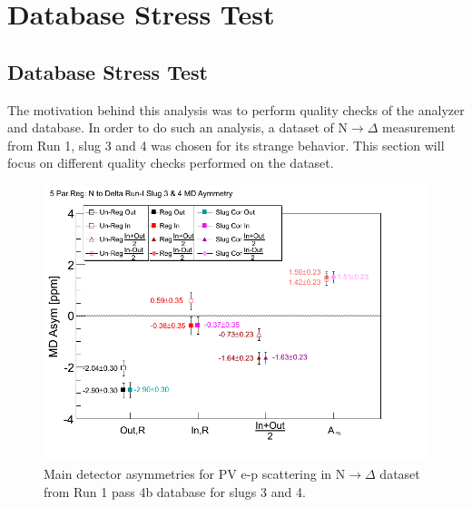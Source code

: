 \chapter{Database Stress Test}
\label{Database Stress Test}

\section{Database Stress Test}
\label{Database Stress Test}

The motivation behind this analysis was to perform quality checks of the analyzer and database. In order to do such an analysis, a dataset of N$\rightarrow\Delta$ measurement from Run 1, slug 3 and 4 was chosen for its strange behavior. This section will focus on different quality checks performed on the dataset. 



\begin{singlespace}
\begin{figure}[!h]
	\begin{center}
	\includegraphics[width=15.0cm]{figures/n2DeltaMDSummaryPlotReg5}
	\end{center}
	\caption
	{Main detector asymmetries for PV e-p scattering in N$\rightarrow\Delta$ dataset from Run 1 pass 4b database for slugs 3 and 4.}
	\label{fig:n2DeltaMDSummaryPlotReg5}
\end{figure}
\end{singlespace}


